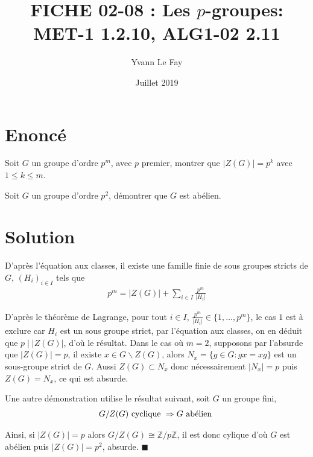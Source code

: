 \documentclass{article}
\newcommand*{\QED}{\hfill\ensuremath{\blacksquare}}%
\begin{document}
\title{FICHE 02-08 : Les $p$-groupes: MET-1 1.2.10, ALG1-02 2.11}
\author{Yvann Le Fay}
\date{Juillet 2019}
\maketitle
\section*{Enoncé}
Soit $G$ un groupe d'ordre $p^m$, avec $p$ premier, montrer que $|Z(G)|=p^k$ avec $1\leq k \leq m$.

Soit $G$ un groupe d'ordre $p^2$, démontrer que $G$ est abélien.
\section*{Solution}
D'après l'équation aux classes, il existe une famille finie de sous groupes stricts de $G$, $(H_i)_{i\in I}$ tels que
\begin{align*}
p^m = |Z(G)| + \sum_{i\in I}\frac{p^m}{|H_i|}
\end{align*}

D'après le théorème de Lagrange, pour tout $i\in I$, $\frac{p^m}{|H_i|}\in \{1,\ldots,p^m\}$, le cas $1$ est à exclure car $H_i$ est un sous groupe strict, par l'équation aux classes, on en déduit que $p\mid |Z(G)|$, d'où le résultat. Dans le cas où $m=2$, supposons par l'absurde que $|Z(G)| = p$, il existe $x\in G\backslash Z(G)$, alors $N_x = \{g\in G : gx=xg\}$ est un sous-groupe strict de $G$. Aussi $Z(G)\subset N_x$ donc nécessairement $|N_x|=p$ puis $Z(G)=N_x$, ce qui est absurde.

Une autre démonstration utilise le résultat suivant, soit $G$ un groupe fini, 
\begin{align*}
	G/Z(G) \textup{ cyclique } \Rightarrow G \textup{ abélien }
\end{align*}

Ainsi, si $|Z(G)| = p$ alors $G/Z(G) \cong \mathbb{Z}/p\mathbb{Z}$, il est donc cylique d'où $G$ est abélien puis $|Z(G)| = p^2$, absurde.
\QED
\end{document}

